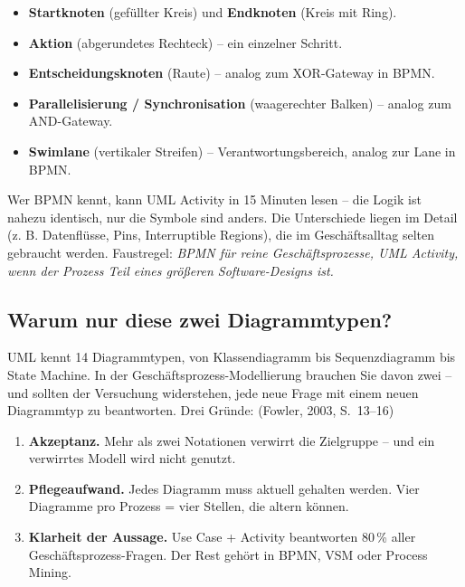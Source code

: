 \documentclass[11pt,a4paper,oneside]{article}
\newcommand{\fachbegriff}[1]{\textbf{#1}}
\newcommand{\quelle}[1]{{\footnotesize\color{lpGray}(#1)}}
\begin{document}
\begin{itemize}
  \item \fachbegriff{Startknoten} (gefüllter Kreis) und \fachbegriff{Endknoten} (Kreis mit Ring).
  \item \fachbegriff{Aktion} (abgerundetes Rechteck) -- ein einzelner Schritt.
  \item \fachbegriff{Entscheidungsknoten} (Raute) -- analog zum XOR-Gateway in BPMN.
  \item \fachbegriff{Parallelisierung / Synchronisation} (waagerechter Balken) -- analog zum AND-Gateway.
  \item \fachbegriff{Swimlane} (vertikaler Streifen) -- Verantwortungsbereich, analog zur Lane in BPMN.
\end{itemize}

\begin{merkbox}
Wer BPMN kennt, kann UML Activity in 15 Minuten lesen -- die Logik ist nahezu identisch, nur die Symbole sind anders. Die Unterschiede liegen im Detail (z. B. Datenflüsse, Pins, Interruptible Regions), die im Geschäftsalltag selten gebraucht werden. Faustregel: \emph{BPMN für reine Geschäftsprozesse, UML Activity, wenn der Prozess Teil eines größeren Software-Designs ist.}
\end{merkbox}

\subsection{Warum nur diese zwei Diagrammtypen?}

UML kennt 14 Diagrammtypen, von Klassendiagramm bis Sequenzdiagramm bis State Machine. In der Geschäftsprozess-Modellierung brauchen Sie davon zwei -- und sollten der Versuchung widerstehen, jede neue Frage mit einem neuen Diagrammtyp zu beantworten. Drei Gründe: \quelle{Fowler, 2003, S.~13--16}

\begin{enumerate}
  \item \textbf{Akzeptanz.} Mehr als zwei Notationen verwirrt die Zielgruppe -- und ein verwirrtes Modell wird nicht genutzt.
  \item \textbf{Pflegeaufwand.} Jedes Diagramm muss aktuell gehalten werden. Vier Diagramme pro Prozess = vier Stellen, die altern können.
  \item \textbf{Klarheit der Aussage.} Use Case + Activity beantworten 80\,\% aller Geschäftsprozess-Fragen. Der Rest gehört in BPMN, VSM oder Process Mining.
\end{enumerate}
\end{document}
